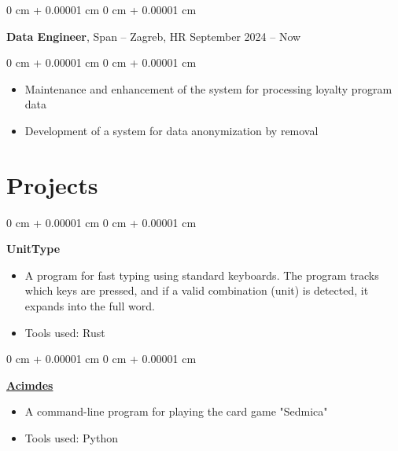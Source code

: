 \documentclass[10pt, letterpaper]{article}
\newenvironment{highlights}{
    \begin{itemize}[
        topsep=0.10 cm,
        parsep=0.10 cm,
        partopsep=0pt,
        itemsep=0pt,
        leftmargin=0 cm + 10pt
    ]
}{
    \end{itemize}
} %
\newenvironment{onecolentry}{
    \begin{adjustwidth}{
        0 cm + 0.00001 cm
    }{
        0 cm + 0.00001 cm
    }
}{
    \end{adjustwidth}
} %
\newenvironment{twocolentry}[2][]{
    \onecolentry
    \def\secondColumn{#2}
    \setcolumnwidth{\fill, 4.5 cm}
    \begin{paracol}{2}
}{
    \switchcolumn \raggedleft \secondColumn
    \end{paracol}
    \endonecolentry
} %
\begin{document}
        \vspace{0.2 cm}

        \begin{twocolentry}{
            September 2024 – Now
        }
            \textbf{Data Engineer}, Span -- Zagreb, HR\end{twocolentry}

        \vspace{0.10 cm}
        \begin{onecolentry}
            \begin{highlights}
                \item Maintenance and enhancement of the system for processing loyalty program data
                \item Development of a system for data anonymization by removal
            \end{highlights}
        \end{onecolentry}


    \section{Projects}

        \begin{onecolentry}
            \textbf{UnitType}
            \vspace{0.10 cm}
            \begin{highlights}
                \item A program for fast typing using standard keyboards. The program tracks which keys are pressed, and if a valid combination (unit) is detected, it expands into the full word.
                \item Tools used: Rust
            \end{highlights}
        \end{onecolentry}


        \vspace{0.2 cm}

        \begin{onecolentry}
            \href{https://github.com/IvanDerdicDer/Acimdes}{\textbf{Acimdes}}
            \vspace{0.10 cm}
            \begin{highlights}
                \item A command-line program for playing the card game "Sedmica"
                \item Tools used: Python
            \end{highlights}
        \end{onecolentry}
\end{document}
